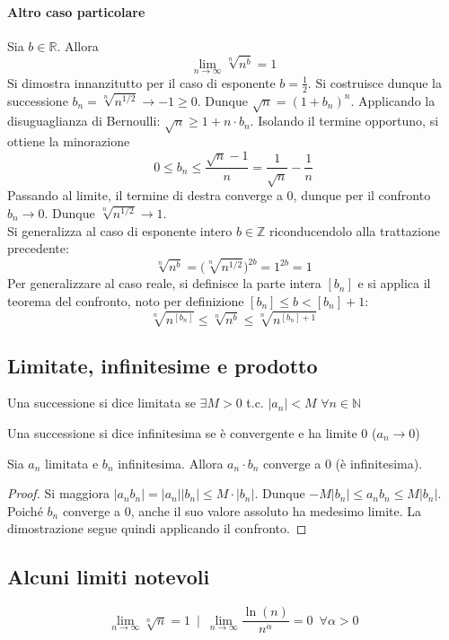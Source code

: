 \documentclass[10pt]{article}
\theoremstyle{plain}
\begin{document}
\paragraph{Altro caso particolare}
Sia $b \in \mathbb{R}$. Allora
\[\lim \limits_{n \rightarrow \infty} \sqrt[n]{n^b} = 1\]
Si dimostra innanzitutto per il caso di esponente $b = \frac{1}{2}$. Si costruisce dunque la successione $b_n = \sqrt[n]{n^{1/2}} \rightarrow - 1 \geq 0$. Dunque $\sqrt{n} = (1 + b_n)^n$. Applicando la disuguaglianza di Bernoulli: $\sqrt{n} \geq 1 + n \cdot b_n$. Isolando il termine opportuno, si ottiene la minorazione
\[0 \leq b_n \leq \frac{\sqrt{n} - 1}{n} = \frac{1}{\sqrt{n}} - \frac{1}{n}\]
Passando al limite, il termine di destra converge a 0, dunque per il confronto $b_n \rightarrow 0$. Dunque $\sqrt[n]{n^{1/2}} \rightarrow 1$.
\\Si generalizza al caso di esponente intero $b \in \mathbb{Z}$ riconducendolo alla trattazione precedente:
\[\sqrt[n]{n^b} = \big(\sqrt[n]{n^{1/2}}\big)^{2b} = 1^{2b} = 1\]
Per generalizzare al caso reale, si definisce la parte intera $[b_n]$ e si applica il teorema del confronto, noto per definizione $[b_n] \leq b < [b_n] + 1$:
\[\sqrt[n]{n^{[b_n]}} \leq \sqrt[n]{n^b}\leq \sqrt[n]{n^{[b_n] + 1}}\]

\subsection{Limitate, infinitesime e prodotto}
\begin{defin}
    Una successione si dice limitata se $\exists M > 0$ t.c. $|a_n| < M$ $\forall n \in \mathbb{N}$
\end{defin}
\begin{defin}
    Una successione si dice infinitesima se è convergente e ha limite 0 ($a_n \rightarrow 0$)
\end{defin}
\begin{ther}
    Sia $a_n$ limitata e $b_n$ infinitesima. Allora $a_n \cdot b_n$ converge a 0 (è infinitesima).
\end{ther}
\begin{proof}
    Si maggiora $|a_n b_n| = |a_n| |b_n| \leq M \cdot |b_n|$. Dunque $- M |b_n| \leq a_n b_n \leq M |b_n|$. Poiché $b_n$ converge a 0, anche il suo valore assoluto ha medesimo limite. La dimostrazione segue quindi applicando il confronto.
\end{proof}

\subsection{Alcuni limiti notevoli}
\[\lim \limits_{n \rightarrow \infty} \sqrt[n]{n} = 1 \enspace \bigg| \enspace \lim \limits_{n \rightarrow \infty} \frac{\ln(n)}{n^\alpha} = 0 \enspace \forall \alpha > 0\]
\end{document}
